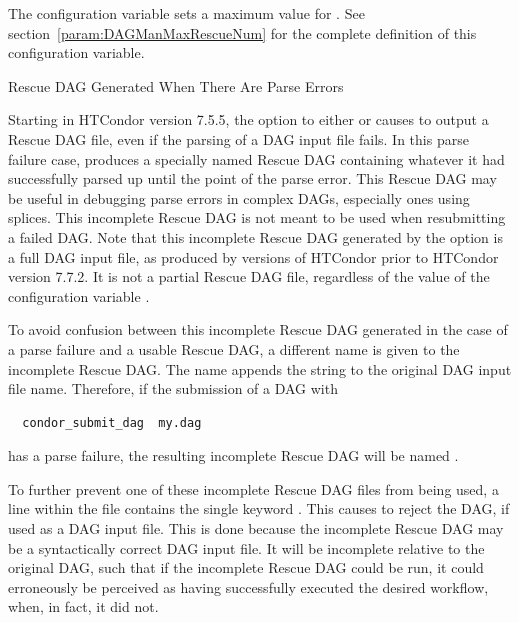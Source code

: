 The configuration variable 
sets a maximum value for \verb@XXX@.
See section~\ref{param:DAGManMaxRescueNum} for the complete definition
of this configuration variable.


\label{dagman:rescue_parse_error}
\begin{description}
\item[Rescue DAG Generated When There Are Parse Errors]
\end{description}

Starting in HTCondor version 7.5.5,
the  option to either  or 
causes  to output a Rescue DAG file, 
even if the parsing of a DAG input file fails.
In this parse failure case,  produces a specially 
named Rescue DAG containing whatever it had successfully parsed up
until the point of the parse error.
This Rescue DAG may be useful in debugging parse errors in complex DAGs,
especially ones using splices.
This incomplete Rescue DAG is not meant to be used when resubmitting
a failed DAG.  
Note that this incomplete Rescue DAG generated by the 
option is a full DAG input file, 
as produced by versions of HTCondor prior to HTCondor version 7.7.2.
It is not a partial Rescue DAG file,
regardless of the value of the configuration variable
.

To avoid confusion between this incomplete Rescue DAG
generated in the case of a parse failure and a usable Rescue DAG,
a different name is given to the incomplete Rescue DAG.
The name appends the string  to the original
DAG input file name.
Therefore, if the submission of a DAG with
\begin{verbatim}
  condor_submit_dag  my.dag
\end{verbatim}
has a parse failure, the resulting incomplete Rescue DAG will be
named .

To further prevent one of these incomplete Rescue DAG files from being used,
a line within the file contains the single keyword .
This causes  to reject the DAG, if used as a DAG input file.
This is done because the
incomplete Rescue DAG may be a syntactically correct DAG input file.
It will be incomplete relative to the original DAG,
such that if the incomplete Rescue DAG could be run,
it could erroneously be perceived as
having successfully executed the desired workflow, when, in fact,
it did not.

